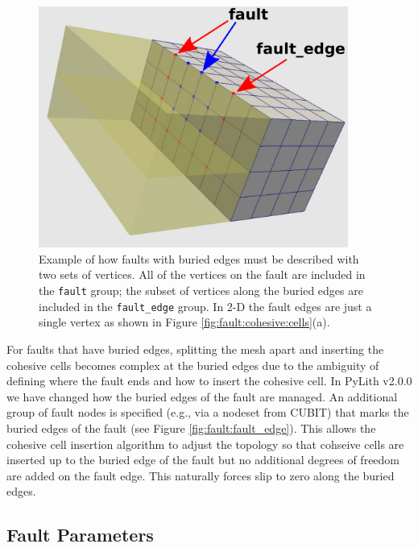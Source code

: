 \begin{figure}[H]
\begin{centering}
\includegraphics[width=4in]{boundaryconditions/figs/faultEdge}
\par\end{centering}

\caption{Example of how faults with buried edges must be described with two
sets of vertices. All of the vertices on the fault are included in
the \texttt{fault} group; the subset of vertices along the buried
edges are included in the \texttt{fault\_edge} group. In 2-D the fault
edges are just a single vertex as shown in Figure \vref{fig:fault:cohesive:cells}(a).\label{fig:fault:fault_edge}}
\end{figure}
For faults that have buried edges, splitting the mesh apart and inserting
the cohesive cells becomes complex at the buried edges due to the
ambiguity of defining where the fault ends and how to insert the cohesive
cell. In PyLith v2.0.0 we have changed how the buried edges of the
fault are managed. An additional group of fault nodes is specified
(e.g., via a nodeset from CUBIT) that marks the buried edges of the
fault (see Figure \vref{fig:fault:fault_edge}). This allows the cohesive
cell insertion algorithm to adjust the topology so that cohseive cells
are inserted up to the buried edge of the fault but no additional
degrees of freedom are added on the fault edge. This naturally forces
slip to zero along the buried edges.


\subsection{Fault Parameters}

